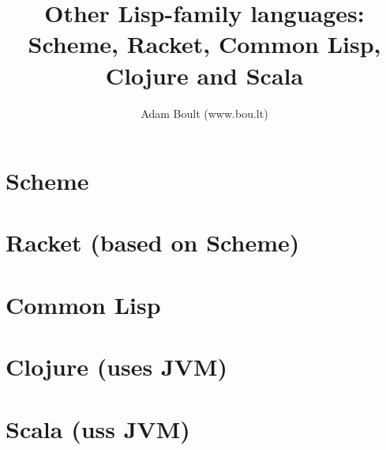 \documentclass[oneside]{book}
\begin{document}
\author{Adam Boult (www.bou.lt)}
\title{Other Lisp-family languages: Scheme, Racket, Common Lisp, Clojure and Scala}
\maketitle

\setcounter{tocdepth}{0}
\tableofcontents



\part{Scheme}

\part{Racket (based on Scheme)}

\part{Common Lisp}

\part{Clojure (uses JVM)}

\part{Scala (uss JVM)}
\end{document}
